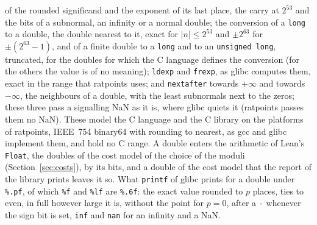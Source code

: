\begin{definition}
  of the rounded significand and the exponent of its last place, the carry at $2^{53}$ and the bits
  of a subnormal, an infinity or a normal double; the conversion of a \verb|long| to a double, the
  double nearest to it, exact for $|n| \le 2^{53}$ and $\pm 2^{63}$ for $\pm(2^{63} - 1)$, and of a
  finite double to a \verb|long| and to an \verb|unsigned long|, truncated, for the doubles for
  which the C language defines the conversion (for the others the value is of no meaning);
  \verb|ldexp| and \verb|frexp|, as glibc computes them, exact in the range that ratpoints uses; and
  \verb|nextafter| towards $+\infty$ and towards $-\infty$, the neighbours of a double, with the
  least subnormals next to the zeros; these three pass a signalling NaN as it is, where glibc quiets
  it (ratpoints passes them no NaN). These model the C language and the C library on the platforms
  of ratpoints, IEEE~754 binary64 with rounding to nearest, as gcc and glibc implement them, and
  hold no C range. A double enters the arithmetic of Lean's \verb|Float|, the doubles of the cost
  model of the choice of the moduli (Section~\ref{sec:costs}), by its bits, and a double of the cost
  model that the report of the library prints leaves it so. What \verb|printf| of glibc prints for a
  double under \verb|%.pf|, of which \verb|%f| and \verb|%lf| are \verb|%.6f|: the exact value
  rounded to $p$ places, ties to even, in full however large it is, without the point for $p = 0$,
  after a \verb|-| whenever the sign bit is set, \verb|inf| and \verb|nan| for an infinity and a
  NaN.
\end{definition}

